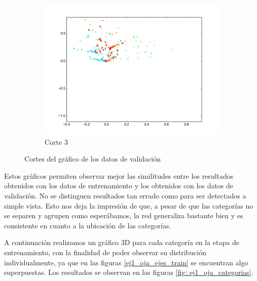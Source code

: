 \begin{figure}[H]
\begin{subfigure}[b]{0.33\textwidth}
                \includegraphics[width=\linewidth]{secciones/graficos/oja/eje3_valid.png}
                \caption{Corte 3}
                \label{fig: ej1_oja_eje_3_valid}
        \end{subfigure}
        \caption{Cortes del gráfico de los datos de validación}
        \label{fig: ej1_oja_ejes_valid}
\end{figure}


\par Estos gráficos permiten observar mejor las similitudes entre los resultados obtenidos con los datos de entrenamiento y los obtenidos con los datos de validación. No se distinguen resultados tan errado como para ser detectados a simple vista. Esto nos deja la impresión de que, a pesar de que las categorías no se separen y agrupen como esperábamos, la red generaliza bastante bien y es consistente en cuanto a la ubicación de las categorías.

\par A continuación realizamos un gráfico 3D para cada categoría en la etapa de entrenamiento, con la finalidad de poder observar su distribución individualmente, ya que en las figuras \ref{ej1_oja_ejes_train} se encuentran algo superpuestas. Los resultados se observan en las figuras \ref{fig: ej1_oja_categorias}.

